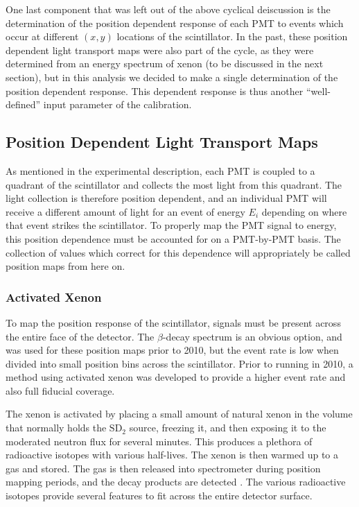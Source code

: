One last component that was left out of the above cyclical deiscussion is the determination of the position
dependent response of each PMT to events which occur at different $(x,y)$ locations of the scintillator.
In the past, these position dependent light transport maps were also part of the cycle, as they were
determined from an energy spectrum of xenon (to be discussed in the next section), but in this analysis
we decided to make a single determination of the position dependent response. This dependent response is thus
another ``well-defined'' input parameter of the calibration.


\subsection{Position Dependent Light Transport Maps} \label{ssec:posmaps}

As mentioned in the experimental description, each PMT is coupled to a quadrant of
the scintillator and collects the most light from this quadrant. The light collection
is therefore position dependent, and an individual PMT will receive a different
amount of light for an event of energy $E_i$ depending on where that event strikes
the scintillator. To properly map the PMT signal to energy, this position dependence
must be accounted for on a PMT-by-PMT basis. The collection of values which correct for this
dependence will appropriately be called position maps from here on.


\subsubsection{Activated Xenon}

To map the position response of the scintillator, signals must be present across the
entire face of the detector. The $\beta$-decay spectrum
is an obvious option, and was used for these position maps prior to 2010,
but the event rate is low when divided into small position bins across the scintillator.
Prior to running in 2010, a method using activated xenon was developed to provide
a higher event rate and also full fiducial coverage.

The xenon is activated by placing a small amount of natural xenon in the volume that
normally holds the $\mathrm{SD}_2$ source, freezing it, and then exposing it to the moderated
neutron flux for several minutes. This produces a plethora of radioactive isotopes
with various half-lives. The xenon is then warmed up to a gas and stored. The gas
is then released into spectrometer during position mapping periods, and the decay products
are detected \cite{mpmThesis}. The various radioactive isotopes provide several features to fit across the entire
detector surface.

